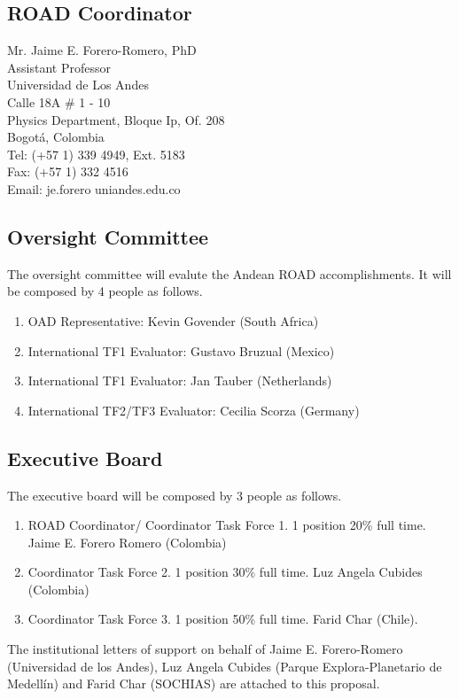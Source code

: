\documentclass[12pt]{article}
\begin{document}
\subsection*{ROAD Coordinator}
\noindent
Mr. Jaime E. Forero-Romero, PhD\\
Assistant Professor\\
Universidad de Los Andes\\
Calle 18A \# 1 - 10\\
Physics Department, Bloque Ip, Of. 208\\
Bogot\'a, Colombia\\
Tel:  (+57 1) 339 4949, Ext. 5183\\
Fax: (+57 1) 332 4516 \\
Email: je.forero uniandes.edu.co\\

\subsection*{Oversight Committee}

The oversight committee will evalute the Andean ROAD
accomplishments. It will be composed by 4 people as follows.
\begin{enumerate}
\item OAD Representative: Kevin Govender (South Africa)
\item International TF1 Evaluator: Gustavo Bruzual (Mexico)
\item International TF1 Evaluator: Jan Tauber (Netherlands)
\item International TF2/TF3 Evaluator: Cecilia Scorza (Germany)
\end{enumerate}
\subsection*{Executive Board}
\noindent
The executive board will be composed by 3 people as follows.
\begin{enumerate}
\item ROAD Coordinator/ Coordinator Task Force 1. 1 position 20\% full
  time. Jaime E. Forero Romero (Colombia) 
\item Coordinator Task Force 2. 1 position 30\% full time. Luz Angela
  Cubides (Colombia) 
\item Coordinator Task Force 3. 1 position 50\% full time. Farid Char
  (Chile). 
\end{enumerate}

\noindent
The institutional letters of support on behalf of Jaime
E. Forero-Romero (Universidad de los Andes), Luz Angela Cubides
(Parque Explora-Planetario de Medell\'in) and Farid Char (SOCHIAS) are
attached to this proposal. 
\end{document}
